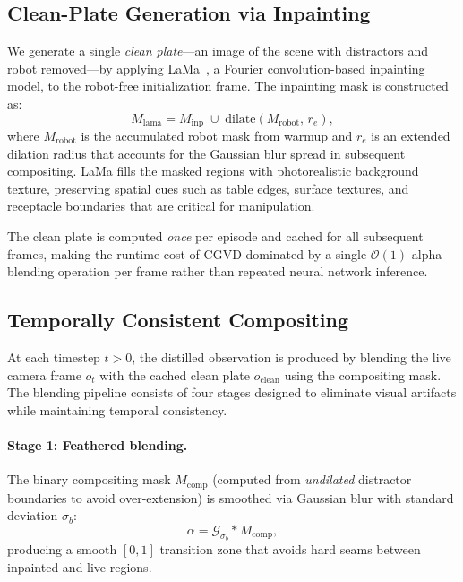 \subsection{Clean-Plate Generation via Inpainting}
\label{sec:inpainting}

We generate a single \emph{clean plate}---an image of the scene with distractors and robot removed---by applying LaMa~\cite{lama}, a Fourier convolution-based inpainting model, to the robot-free initialization frame. The inpainting mask is constructed as:
\begin{equation}
    M_{\text{lama}} = M_{\text{inp}} \;\cup\; \text{dilate}(M_{\text{robot}},\, r_e),
    \label{eq:inpaint_mask}
\end{equation}
where $M_{\text{robot}}$ is the accumulated robot mask from warmup and $r_e$ is an extended dilation radius that accounts for the Gaussian blur spread in subsequent compositing. LaMa fills the masked regions with photorealistic background texture, preserving spatial cues such as table edges, surface textures, and receptacle boundaries that are critical for manipulation.

The clean plate is computed \emph{once} per episode and cached for all subsequent frames, making the runtime cost of CGVD dominated by a single $\mathcal{O}(1)$ alpha-blending operation per frame rather than repeated neural network inference.

\subsection{Temporally Consistent Compositing}
\label{sec:compositing}

At each timestep $t > 0$, the distilled observation is produced by blending the live camera frame $o_t$ with the cached clean plate $\hat{o}_{\text{clean}}$ using the compositing mask. The blending pipeline consists of four stages designed to eliminate visual artifacts while maintaining temporal consistency.

\paragraph{Stage 1: Feathered blending.}
The binary compositing mask $M_{\text{comp}}$ (computed from \emph{undilated} distractor boundaries to avoid over-extension) is smoothed via Gaussian blur with standard deviation $\sigma_b$:
\begin{equation}
    \alpha = \mathcal{G}_{\sigma_b} * M_{\text{comp}},
    \label{eq:feather}
\end{equation}
producing a smooth $[0, 1]$ transition zone that avoids hard seams between inpainted and live regions.

